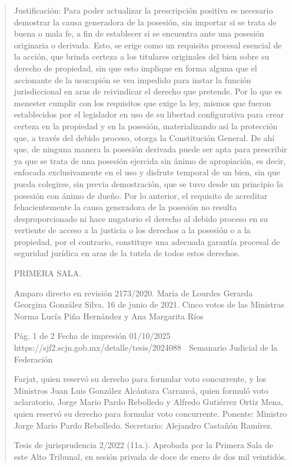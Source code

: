 \documentclass[11pt,a4paper]{article}
\begin{document}
\begin{quote}
Justificación: Para poder actualizar la prescripción positiva es necesario demostrar la causa
generadora de la posesión, sin importar si se trata de buena o mala fe, a fin de establecer si se
encuentra ante una posesión originaria o derivada. Esto, se erige como un requisito procesal
esencial de la acción, que brinda certeza a los titulares originales del bien sobre su derecho de
propiedad, sin que esto implique en forma alguna que el accionante de la usucapión se vea
impedido para instar la función jurisdiccional en aras de reivindicar el derecho que pretende. Por lo
que es menester cumplir con los requisitos que exige la ley, mismos que fueron establecidos por el
legislador en uso de su libertad configurativa para crear certeza en la propiedad y en la posesión,
materializando así la protección que, a través del debido proceso, otorga la Constitución General.
De ahí que, de ninguna manera la posesión derivada puede ser apta para prescribir ya que se trata
de una posesión ejercida sin ánimo de apropiación, es decir, enfocada exclusivamente en el uso y
disfrute temporal de un bien, sin que pueda colegirse, sin previa demostración, que se tuvo desde
un principio la posesión con ánimo de dueño. Por lo anterior, el requisito de acreditar
fehacientemente la causa generadora de la posesión no resulta desproporcionado ni hace nugatorio
el derecho al debido proceso en su vertiente de acceso a la justicia o los derechos a la posesión o a
la propiedad, por el contrario, constituye una adecuada garantía procesal de seguridad jurídica en
aras de la tutela de todos estos derechos.

PRIMERA SALA.


Amparo directo en revisión 2173/2020. María de Lourdes Gerarda Georgina González Silva. 16 de
junio de 2021. Cinco votos de las Ministras Norma Lucía Piña Hernández y Ana Margarita Ríos

                                              Pág. 1 de 2             Fecha de impresión 01/10/2025
  https://sjf2.scjn.gob.mx/detalle/tesis/2024088
                                                  Semanario Judicial de la Federación

Farjat, quien reservó su derecho para formular voto concurrente, y los Ministros Juan Luis González
Alcántara Carrancá, quien formuló voto aclaratorio, Jorge Mario Pardo Rebolledo y Alfredo Gutiérrez
Ortiz Mena, quien reservó su derecho para formular voto concurrente. Ponente: Ministro Jorge Mario
Pardo Rebolledo. Secretario: Alejandro Castañón Ramírez.

Tesis de jurisprudencia 2/2022 (11a.). Aprobada por la Primera Sala de este Alto Tribunal, en sesión
privada de doce de enero de dos mil veintidós.



\end{quote}
\end{document}
